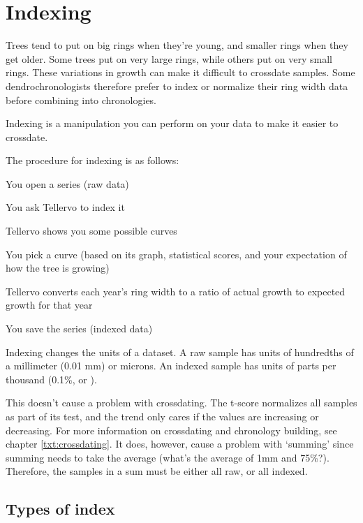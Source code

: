 \chapter{Indexing}

Trees tend to put on big rings when they're young, and smaller rings when they get older. Some trees put on very large rings, while others put on very small rings. These variations in growth can make it difficult to crossdate samples.  Some dendrochronologists therefore prefer to index or normalize their ring width data before combining into chronologies.

Indexing is a manipulation you can perform on your data to make it easier to crossdate.

The procedure for indexing is as follows:

\begin{enumerate*}
   \item You open a series (raw data)
   \item You ask Tellervo to index it
   \item Tellervo shows you some possible curves
   \item You pick a curve (based on its graph, statistical scores, and your expectation of how the tree is growing)
   \item Tellervo converts each year's ring width to a ratio of actual growth to expected growth for that year
   \item You save the series (indexed data) 
\end{enumerate*}

Indexing changes the units of a dataset. A raw sample has units of hundredths of a millimeter (0.01 mm) or microns. An indexed sample has units of parts per thousand (0.1\%, or \textperthousand).

This doesn't cause a problem with crossdating. The t-score normalizes all samples as part of its test, and the trend only cares if the values are increasing or decreasing. For more information on crossdating and chronology building, see chapter \ref{txt:crossdating}.  It does, however, cause a problem with `summing' since summing needs to take the average (what's the average of 1mm and 75\%?). Therefore, the samples in a sum must be either all raw, or all indexed. 

\section{Types of index}

